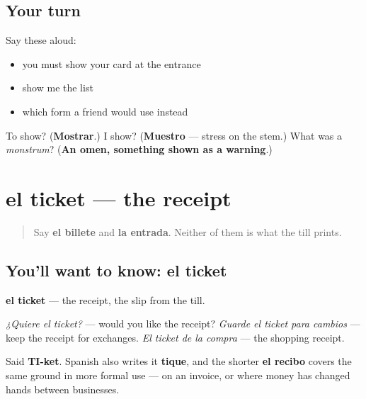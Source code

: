\subsection*{Your turn}
Say these aloud:

\begin{itemize}
\raggedright
  \item you must show your card at the entrance
  \item show me the list
  \item which form a friend would use instead
\end{itemize}

\begin{tcolorbox}[breakable,colback=teal!4,colframe=teal!35!black,title={Before you move on}]
To show? (\textbf{Mostrar}.) I show? (\textbf{Muestro} — stress on the stem.) What was a \emph{monstrum}? (\textbf{An omen, something shown as a warning}.)
\end{tcolorbox}
\section[el ticket]{el ticket — the receipt}

\label{lesson:ES-C451-ticket}



\begin{quote}
Say \textbf{el billete} and \textbf{la entrada}. Neither of them is what the till prints.
\end{quote}

\subsection*{You'll want to know: el ticket}
\textbf{el ticket} — the receipt, the slip from the till.

\emph{¿Quiere el ticket?} — would you like the receipt? \emph{Guarde el ticket para cambios} — keep the receipt for exchanges. \emph{El ticket de la compra} — the shopping receipt.

Said \textbf{TI-ket}. Spanish also writes it \textbf{tique}, and the shorter \textbf{el recibo} covers the same ground in more formal use — on an invoice, or where money has changed hands between businesses.

